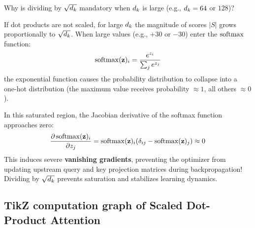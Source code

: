 \documentclass[../labs.tex]{subfiles}
\begin{document}
\begin{examinsight}
Why is dividing by $\sqrt{d_k}$ mandatory when $d_k$ is large (e.g., $d_k = 64$ or $128$)?

If dot products are not scaled, for large $d_k$ the magnitude of scores $|S|$ grows proportionally to $\sqrt{d_k}$. When large values (e.g., $+30$ or $-30$) enter the $\operatorname{\mathrm{softmax}}$ function:
\begin{equation}
    \operatorname{\mathrm{softmax}}(\mathbf{z})_i = \frac{e^{z_i}}{\sum_j e^{z_j}}
\end{equation}
the exponential function causes the probability distribution to collapse into a one-hot distribution (the maximum value receives probability $\approx 1$, all others $\approx 0$).

In this saturated region, the Jacobian derivative of the softmax function approaches zero:
\begin{equation}
    \frac{\partial \operatorname{\mathrm{softmax}}(\mathbf{z})_i}{\partial z_j} = \operatorname{\mathrm{softmax}}(\mathbf{z})_i (\delta_{ij} - \operatorname{\mathrm{softmax}}(\mathbf{z})_j) \approx 0
\end{equation}
This induces severe \textbf{vanishing gradients}, preventing the optimizer from updating upstream query and key projection matrices during backpropagation! Dividing by $\sqrt{d_k}$ prevents saturation and stabilizes learning dynamics.
\end{examinsight}

\subsection{TikZ computation graph of Scaled Dot-Product Attention}
\end{document}
